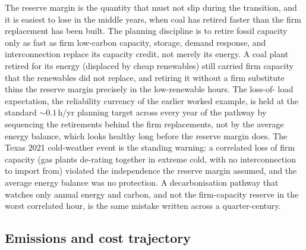 The reserve margin is the quantity that must not slip during the
transition, and it is easiest to lose in the middle years, when coal has
retired faster than the firm replacement has been built. The planning
discipline is to retire fossil capacity only as fast as firm low-carbon
capacity, storage, demand response, and interconnection replace its
capacity credit, not merely its energy. A coal plant retired for its energy
(displaced by cheap renewables) still carried firm capacity that the
renewables did not replace, and retiring it without a firm substitute
thins the reserve margin precisely in the low-renewable hours. The loss-of-
load expectation, the reliability currency of the earlier worked example,
is held at the standard $\sim 0.1\,\si{\hour}/\text{yr}$ planning target
across every year of the pathway by sequencing the retirements behind the
firm replacements, not by the average energy balance, which looks healthy
long before the reserve margin does. The Texas 2021 cold-weather event
\cite{acc:ferc-nerc-texas-2021} is the standing warning: a correlated loss
of firm capacity (gas plants de-rating together in extreme cold, with no
interconnection to import from) violated the independence the reserve
margin assumed, and the average energy balance was no protection. A
decarbonisation pathway that watches only annual energy and carbon, and not
the firm-capacity reserve in the worst correlated hour, is the same mistake
written across a quarter-century.

\subsection{Emissions and cost trajectory}

